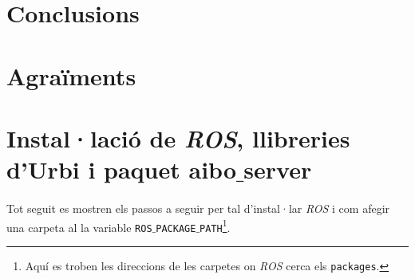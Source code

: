 \documentclass[12pt,a4paper,final,twoside]{article}
\begin{document}
\newpage
\section{Conclusions}

\newpage
\section*{Agraïments}

\newpage




\label{Referencies}


\appendix
\clearpage %
\addappheadtotoc
\appendixpage

\section{Instal·lació de \textit{ROS}, llibreries d'Urbi i paquet aibo$\_$server}

\paragraph{}Tot seguit es mostren els passos a seguir per tal d'instal·lar \textit{ROS} i com afegir una carpeta al la variable \texttt{ROS$\_$PACKAGE$\_$PATH}\footnote{Aquí es troben les direccions de les carpetes on \textit{ROS} cerca els \texttt{packages}.}.
\end{document}
